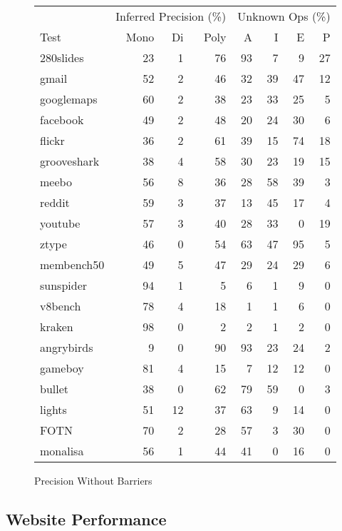 \begin{figure}
\begin{center}
\begin{tabular}{lrrrrrrr}
\toprule
     & \multicolumn{3}{c}{Inferred Precision (\%)}
     & \multicolumn{4}{c}{Unknown Ops (\%)} \\
\cmidrule(r){2-4}
\cmidrule{5-8}
Test & Mono & Di & Poly & A & I & E & P \\
\midrule
280slides      & 23 & 1 & 76 & 93 & 7 & 9 & 27 \\
gmail          & 52 & 2 & 46 & 32 & 39 & 47 & 12 \\
googlemaps     & 60 & 2 & 38 & 23 & 33 & 25 & 5 \\
facebook       & 49 & 2 & 48 & 20 & 24 & 30 & 6 \\
flickr         & 36 & 2 & 61 & 39 & 15 & 74 & 18 \\
grooveshark    & 38 & 4 & 58 & 30 & 23 & 19 & 15 \\
meebo          & 56 & 8 & 36 & 28 & 58 & 39 & 3 \\
reddit         & 59 & 3 & 37 & 13 & 45 & 17 & 4 \\
youtube        & 57 & 3 & 40 & 28 & 33 & 0 & 19 \\
ztype          & 46 & 0 & 54 & 63 & 47 & 95 & 5 \\
membench50     & 49 & 5 & 47 & 29 & 24 & 29 & 6 \\
\midrule
sunspider      & 94 & 1 & 5 & 6 & 1 & 9 & 0 \\
v8bench        & 78 & 4 & 18 & 1 & 1 & 6 & 0 \\
kraken         & 98 & 0 & 2 & 2 & 1 & 2 & 0 \\
\midrule
angrybirds     & 9 & 0 & 90 & 93 & 23 & 24 & 2 \\
gameboy        & 81 & 4 & 15 & 7 & 12 & 12 & 0 \\
bullet         & 38 & 0 & 62 & 79 & 59 & 0 & 3 \\
lights         & 51 & 12 & 37 & 63 & 9 & 14 & 0 \\
FOTN           & 70 & 2 & 28 & 57 & 3 & 30 & 0 \\
monalisa       & 56 & 1 & 44 & 41 & 0 & 16 & 0 \\
\bottomrule
\end{tabular}
\end{center}
\nocaptionrule \caption{Precision Without Barriers}
\end{figure}

\subsection{Website Performance}

